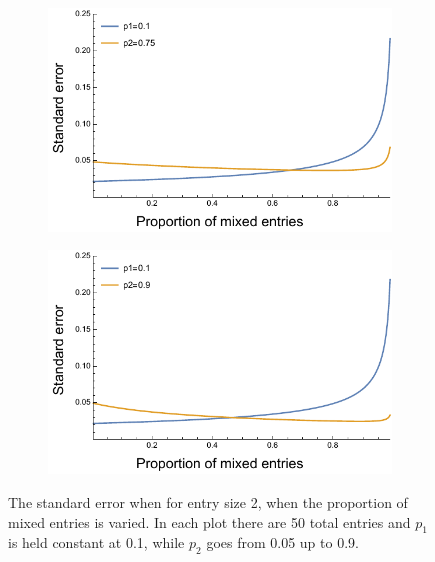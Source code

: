 \documentclass{article}
\begin{document}
\begin{figure}[H]
\begin{subfigure}[b]{0.49\textwidth}
\end{subfigure}
\hfill
\begin{subfigure}[b]{0.49\textwidth}
\includegraphics[width=\textwidth]{../asymptotic_approximation/SE_twotype_p1_01_p2_075.pdf}
\end{subfigure}
\begin{subfigure}[b]{0.49\textwidth}
\includegraphics[width=\textwidth]{../asymptotic_approximation/SE_twotype_p1_01_p2_09.pdf}
\end{subfigure}

\caption{The standard error when for entry size 2, when the proportion of mixed entries is varied. In each plot there are 50 total entries and \(p_1\) is held constant at 0.1, while \(p_2\) goes from 0.05 up to 0.9.}
\label{fig:two_type_se_fourplot}
\end{figure}
\end{document}
